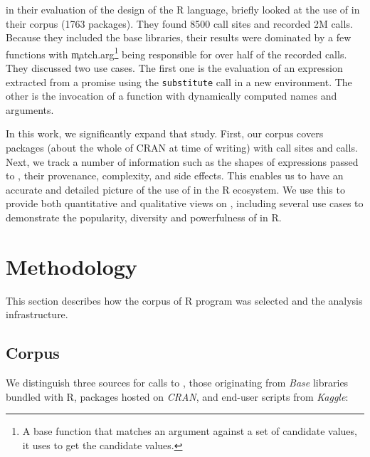 \documentclass[review,screen,acmsmall]{acmart}%
\renewcommand{\k}[1]{\lstinline |#1|\xspace}
\begin{document}
\citet{ecoop12} in their evaluation of the design of the R language, briefly
looked at the use of \eval in their corpus (1763 packages). They found 8500
\eval call sites and recorded 2M \eval calls. Because they included the base
libraries, their results were dominated by a few functions with
\c{match.arg}\footnote{A base function that matches an argument against a set of
candidate values, it uses \eval to get the candidate values.} being responsible
for over half of the recorded \eval calls. They discussed two use cases. The
first one is the evaluation of an expression extracted from a promise using the
\k{substitute} call in a new environment. The other is the invocation of a
function with dynamically computed names and arguments.

In this work, we significantly expand that study. First, our corpus covers
\CranPackages packages (about the whole of CRAN at time of writing) with
\PkgHitEvalCallSites \eval call sites and \packageAllcallsRnd \eval calls.
Next, we track a number of information such as the shapes of expressions
passed to \eval, their provenance, complexity, and side effects. This enables
us to have an accurate and detailed picture of the use of \eval in the R
ecosystem. We use this to provide both quantitative and qualitative views on
\eval, including several use cases to demonstrate the popularity, diversity and
powerfulness of \eval in R.

\section{Methodology}

This section describes how the corpus of R program was selected and the analysis
infrastructure.

\subsection{Corpus}

We distinguish three sources for calls to \eval, those originating from
\emph{Base} libraries bundled with R, packages hosted on \emph{CRAN}, and
end-user scripts from \emph{Kaggle}:
\end{document}
